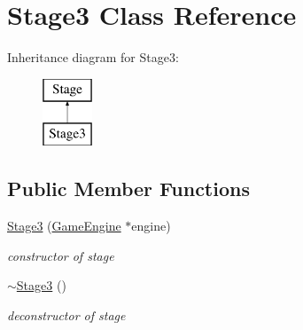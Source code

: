 \hypertarget{class_stage3}{
\section{Stage3 Class Reference}
\label{class_stage3}
}
Inheritance diagram for Stage3:\begin{figure}[H]
\begin{center}
\leavevmode
\includegraphics[height=2.000000cm]{class_stage3}
\end{center}
\end{figure}
\subsection*{Public Member Functions}
\begin{DoxyCompactItemize}
\item 
\hypertarget{class_stage3_a5e68b73c8bee8aa53e149de989c4051e}{
\hyperlink{class_stage3_a5e68b73c8bee8aa53e149de989c4051e}{Stage3} (\hyperlink{class_game_engine}{GameEngine} $\ast$engine)}
\label{class_stage3_a5e68b73c8bee8aa53e149de989c4051e}

\begin{DoxyCompactList}\small\item\em constructor of stage \end{DoxyCompactList}\item 
\hypertarget{class_stage3_adc2245c85026b3428604a42e8396dec5}{
\hyperlink{class_stage3_adc2245c85026b3428604a42e8396dec5}{$\sim$Stage3} ()}
\label{class_stage3_adc2245c85026b3428604a42e8396dec5}

\begin{DoxyCompactList}\small\item\em deconstructor of stage \end{DoxyCompactList}\end{DoxyCompactItemize}
